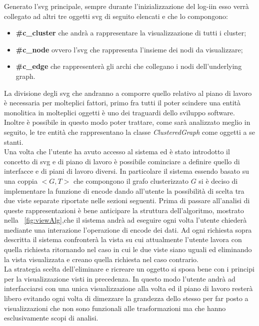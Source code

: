 {Generato l'svg principale, sempre durante l'inizializzazione del log-iin esso verrà collegato ad altri tre oggetti svg di seguito elencati e che lo compongono:
\begin{itemize}
	\item \textbf{\#c\_cluster} che andrà a rappresentare la visualizzazione di tutti i cluster; 
	\item \textbf{\#c\_node} ovvero l'svg che rappresenta l'insieme dei nodi da visualizzare;
	\item \textbf{\#c\_edge} che rappresenterà gli archi che collegano i nodi dell'underlying graph.
\end{itemize}
La divisione degli svg che andranno a comporre quello relativo al piano di lavoro è necessaria per molteplici fattori, primo fra tutti il poter scindere una entità monolitica in molteplici oggetti è uno dei traguardi dello sviluppo software. Inoltre è possibile in questo modo poter trattare, come sarà analizzato meglio in seguito, le tre entità che rappresentano la classe \textit{ClusteredGraph} come oggetti a se stanti.\\
Una volta che l'utente ha avuto accesso al sistema ed è stato introdotto il concetto di svg e di piano di lavoro è possibile cominciare a definire quello di interfacce e di piani di lavoro diversi.
In particolare il sistema essendo basato su una coppia $<G,T>$ che compongono il grafo clusterizzato $G$ si è deciso di implementare la funzione di encode dando all'utente la possibilità di scelta tra due viste separate riportate nelle sezioni seguenti. Prima di passare all'analisi di queste rappresentazioni è bene anticipare la struttura dell'algoritmo, mostrato nella \figurename~\ref{fig:viewAlg},che il sistema andrà ad eseguire ogni volta l'utente chiederà mediante una interazione l'operazione di encode dei dati. Ad ogni richiesta sopra descritta il sistema confronterà la vista su cui attualmente l'utente lavora con quella richiesta ritornando nel caso in cui le due viste siano uguali ed eliminando la vista visualizzata e creano quella richiesta nel caso contrario.\\
La strategia scelta dell'eliminare e ricreare un oggetto si sposa bene con i principi per la visualizzazione visti in precedenza. In questo modo l'utente andrà ad interfacciarsi con una unica visualizzazione alla volta ed il piano di lavoro resterà libero evitando ogni volta di dimezzare la grandezza dello stesso per far posto a visualizzazioni che non sono funzionali alle trasformazioni ma che hanno esclusivamente scopi di analisi.
\begin{figure}[!htb]

\end{figure}}
